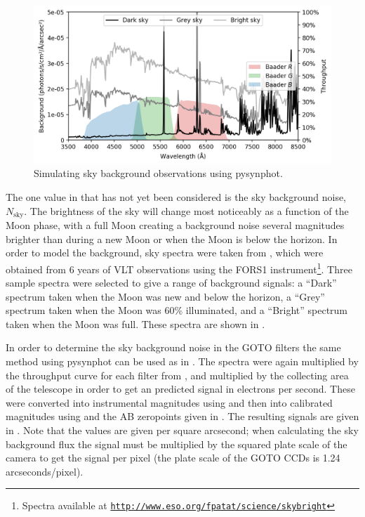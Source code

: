 \begin{colsection}
\begin{colsection}
\begin{figure}[t]
    \begin{center}
        \includegraphics[width=\textwidth]{images/throughput/background.png}
    \end{center}
    \caption[Simulating sky background observations]{
        Simulating sky background observations using pysynphot.
    }\label{fig:background}
\end{figure}

The one value in  that has not yet been considered is the sky background noise, $N_\text{sky}$. The brightness of the sky will change most noticeably as a function of the Moon phase, with a full Moon creating a background noise several magnitudes brighter than during a new Moon or when the Moon is below the horizon. In order to model the background, sky spectra were taken from \citet{sky_background}, which were obtained from 6 years of VLT observations using the FORS1 instrument\footnote{Spectra available at \href{http://www.eso.org/~fpatat/science/skybright}{\texttt{http://www.eso.org/\raisebox{0.5ex}{\texttildelow}fpatat/science/skybright}}}. Three sample spectra were selected to give a range of background signals: a ``Dark'' spectrum taken when the Moon was new and below the horizon, a ``Grey'' spectrum taken when the Moon was 60\% illuminated, and a ``Bright'' spectrum taken when the Moon was full. These spectra are shown in .

In order to determine the sky background noise in the GOTO filters the same method using pysynphot can be used as in . The spectra were again multiplied by the throughput curve for each filter from , and multiplied by the collecting area of the telescope in order to get an predicted signal in electrons per second. These were converted into instrumental magnitudes using  and then into calibrated magnitudes using  and the AB zeropoints given in . The resulting signals are given in . Note that the values are given per square arcsecond; when calculating the sky background flux the signal must be multiplied by the squared plate scale of the camera to get the signal per pixel (the plate scale of the GOTO CCDs is 1.24 arcseconds/pixel).


\end{colsection}
\end{colsection}
